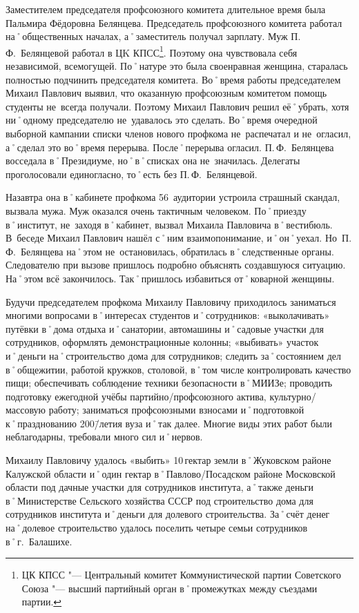 Заместителем председателя профсоюзного комитета длительное время была Пальмира Фёдоровна Белянцева. Председатель профсоюзного комитета работал на˚общественных началах, а˚заместитель получал зарплату. Муж П.\,Ф.~Белянцевой работал в ЦK КПСС\footnote{ЦК КПСС "--- Центральный комитет Коммунистической партии Советского Союза "--- высший партийный орган в˚промежутках между съездами партии.}. Поэтому она чувствовала себя независимой, всемогущей. По˚натуре это была своенравная женщина, старалась полностью подчинить председателя комитета. Во˚время работы председателем Михаил Павлович выявил, что оказанную профсоюзным комитетом помощь студенты не~всегда получали. Поэтому Михаил Павлович решил её˚убрать, хотя ни˚одному председателю не~удавалось это сделать. Во˚время очередной выборной кампании списки членов нового профкома не~распечатал и не~огласил, а˚сделал это во˚время перерыва. После˚перерыва огласил. П.\,Ф.~Белянцева восседала в˚Президиуме, но˚в˚списках она не~значилась. Делегаты проголосовали единогласно, то˚есть без П.\,Ф.~Белянцевой. 

Назавтра она в˚кабинете профкома 56~аудитории устроила страшный скандал, вызвала мужа. Муж оказался очень тактичным человеком. По˚приезду в˚институт, не~заходя в˚кабинет, вызвал Михаила Павловича в˚вестибюль. В~беседе Михаил Павлович нашёл с˚ним взаимопонимание, и˚он˚уехал. Но~П.\,Ф.~Белянцева на˚этом не~остановилась, обратилась в˚следственные органы. Следователю при вызове пришлось подробно объяснять создавшуюся ситуацию. На˚этом всё закончилось. Так˚пришлось избавиться от˚коварной женщины. 

Будучи председателем профкома Михаилу Павловичу приходилось заниматься многими вопросами в˚интересах студентов и˚сотрудников: 
«выколачивать» путёвки в˚дома отдыха и˚санатории, автомашины и˚садовые участки для сотрудников, оформлять демонстрационные колонны;
«выбивать» участок и˚деньги на˚строительство дома для сотрудников;  
следить за˚состоянием дел в˚общежитии, работой кружков, столовой, в˚том числе контролировать качество пищи;
обеспечивать соблюдение техники безопасности в˚МИИЗе;
проводить подготовку ежегодной учёбы партийно\-/профсоюзного актива, культурно\-/массовую работу; 
заниматься профсоюзными взносами и˚подготовкой к˚празднованию 200\=/летия вуза и˚так далее. Многие виды этих работ были неблагодарны, требовали много сил и˚нервов. 

Михаилу Павловичу удалось «выбить» 10\,гектар земли в˚Жуковском районе Калужской области и˚один гектар в˚Павлово\-/Посадском районе Московской области под дачные участки для сотрудников института, а˚также деньги в˚Министерстве Сельского хозяйства СССР под строительство дома для сотрудников института и˚деньги для долевого строительства. За˚счёт денег на˚долевое строительство удалось поселить четыре семьи сотрудников в˚г.~Балашихе.

